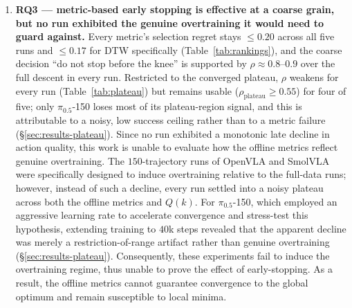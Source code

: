 \documentclass[english,12pt,a4paper,pdftex,elec,utf8]{aaltothesis}
\begin{document}
\begin{enumerate}
  \item \textbf{RQ3 --- metric-based early stopping is effective at a coarse grain, but no run exhibited the genuine overtraining it would need to guard against.}
    \label{conc:plateau}
    Every metric's selection regret stays $\le0.20$ across all five runs and $\le0.17$ for DTW specifically (Table~\ref{tab:rankings}), and the coarse decision ``do not stop before the knee'' is supported by $\rho\approx0.8$--$0.9$ over the full descent in every run. Restricted to the converged plateau, $\rho$ weakens for every run (Table~\ref{tab:plateau}) but remains usable ($\rho_{\mathrm{plateau}}\ge0.55$) for four of five; only $\pi_{0.5}$-150 loses most of its plateau-region signal, and this is attributable to a noisy, low success ceiling rather than to a metric failure (\S\ref{sec:results-plateau}).
    \label{conc:overtrain}
    Since no run exhibited a monotonic late decline in action quality, this work is unable to evaluate how the offline metrics reflect genuine overtraining. The $150$-trajectory runs of OpenVLA and SmolVLA were specifically designed to induce overtraining relative to the full-data runs; however, instead of such a decline, every run settled into a noisy plateau across both the offline metrics and $Q(k)$. For $\pi_{0.5}$-150, which employed an aggressive learning rate to accelerate convergence and stress-test this hypothesis, extending training to $40$k steps revealed that the apparent decline was merely a restriction-of-range artifact rather than genuine overtraining (\S\ref{sec:results-plateau}). Consequently, these experiments fail to induce the overtraining regime, thus unable to prove the effect of early-stopping. As a result, the offline metrics cannot guarantee convergence to the global optimum and remain susceptible to local minima.


\end{enumerate}
\end{document}
